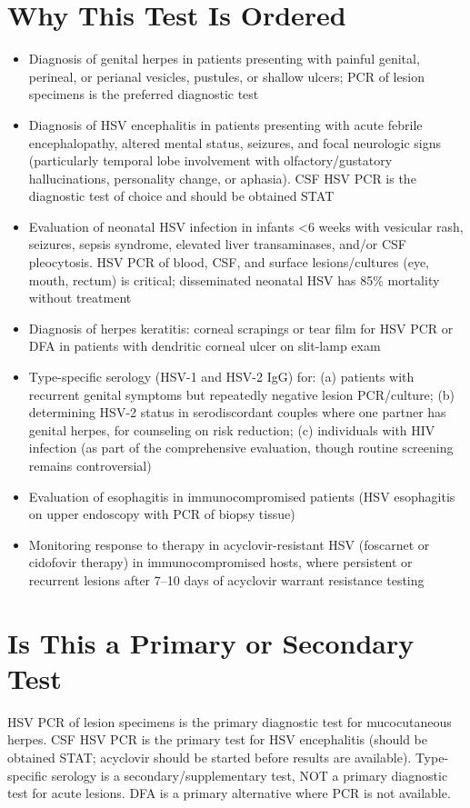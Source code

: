 \section*{Why This Test Is Ordered}
\begin{itemize}
  \item Diagnosis of genital herpes in patients presenting with painful genital, perineal, or perianal vesicles, pustules, or shallow ulcers; PCR of lesion specimens is the preferred diagnostic test
  \item Diagnosis of HSV encephalitis in patients presenting with acute febrile encephalopathy, altered mental status, seizures, and focal neurologic signs (particularly temporal lobe involvement with olfactory/gustatory hallucinations, personality change, or aphasia). CSF HSV PCR is the diagnostic test of choice and should be obtained STAT
  \item Evaluation of neonatal HSV infection in infants <6 weeks with vesicular rash, seizures, sepsis syndrome, elevated liver transaminases, and/or CSF pleocytosis. HSV PCR of blood, CSF, and surface lesions/cultures (eye, mouth, rectum) is critical; disseminated neonatal HSV has 85\% mortality without treatment
  \item Diagnosis of herpes keratitis: corneal scrapings or tear film for HSV PCR or DFA in patients with dendritic corneal ulcer on slit-lamp exam
  \item Type-specific serology (HSV-1 and HSV-2 IgG) for: (a) patients with recurrent genital symptoms but repeatedly negative lesion PCR/culture; (b) determining HSV-2 status in serodiscordant couples where one partner has genital herpes, for counseling on risk reduction; (c) individuals with HIV infection (as part of the comprehensive evaluation, though routine screening remains controversial)
  \item Evaluation of esophagitis in immunocompromised patients (HSV esophagitis on upper endoscopy with PCR of biopsy tissue)
  \item Monitoring response to therapy in acyclovir-resistant HSV (foscarnet or cidofovir therapy) in immunocompromised hosts, where persistent or recurrent lesions after 7--10 days of acyclovir warrant resistance testing
\end{itemize}

\section*{Is This a Primary or Secondary Test}
HSV PCR of lesion specimens is the primary diagnostic test for mucocutaneous herpes. CSF HSV PCR is the primary test for HSV encephalitis (should be obtained STAT; acyclovir should be started before results are available). Type-specific serology is a secondary/supplementary test, NOT a primary diagnostic test for acute lesions. DFA is a primary alternative where PCR is not available.

